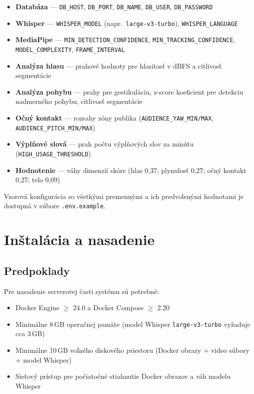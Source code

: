 \begin{itemize}
    \item \textbf{Databáza} — \texttt{DB\_HOST}, \texttt{DB\_PORT}, \texttt{DB\_NAME}, \texttt{DB\_USER}, \texttt{DB\_PASSWORD}
    \item \textbf{Whisper} — \texttt{WHISPER\_MODEL} (napr.\ \texttt{large-v3-turbo}), \texttt{WHISPER\_LANGUAGE}
    \item \textbf{MediaPipe} — \texttt{MIN\_DETECTION\_CONFIDENCE}, \texttt{MIN\_TRACKING\_CONFIDENCE}, \texttt{MODEL\_COMPLEXITY}, \texttt{FRAME\_INTERVAL}
    \item \textbf{Analýza hlasu} — prahové hodnoty pre hlasitosť v dBFS a citlivosť segmentácie
    \item \textbf{Analýza pohybu} — prahy pre gestikuláciu, z-score koeficient pre detekciu nadmerného pohybu, citlivosť segmentácie
    \item \textbf{Očný kontakt} — rozsahy zóny publika (\texttt{AUDIENCE\_YAW\_MIN/MAX}, \texttt{AUDIENCE\_PITCH\_MIN/MAX})
    \item \textbf{Výplňové slová} — prah počtu výplňových slov za minútu (\texttt{HIGH\_USAGE\_THRESHOLD})
    \item \textbf{Hodnotenie} — váhy dimenzií skóre (hlas 0,37; plynulosť 0,27; očný kontakt 0,27; telo 0,09)
\end{itemize}

Vzorová konfigurácia so všetkými premennými a ich predvolenými hodnotami je dostupná v súbore \texttt{.env.example}.

\section{Inštalácia a nasadenie}

\subsection{Predpoklady}

Pre nasadenie serverovej časti systému sú potrebné:

\begin{itemize}
    \item Docker Engine $\geq$ 24.0 a Docker Compose $\geq$ 2.20
    \item Minimálne 8\,GB operačnej pamäte (model Whisper \texttt{large-v3-turbo} vyžaduje cca 3\,GB)
    \item Minimálne 10\,GB voľného diskového priestoru (Docker obrazy + video súbory + model Whisper)
    \item Sieťový prístup pre počiatočné stiahnutie Docker obrazov a váh modelu Whisper
\end{itemize}

